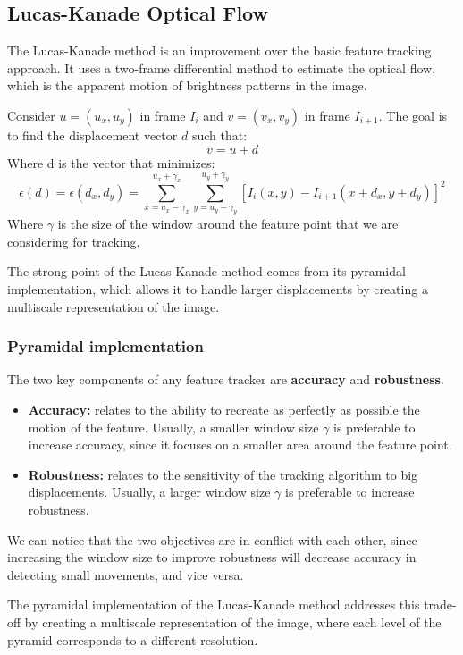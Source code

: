 \subsection{Lucas-Kanade Optical Flow}
The Lucas-Kanade method is an improvement over the basic feature tracking approach.
It uses a two-frame differential method to estimate the optical flow, which is the apparent motion of brightness patterns in the image.

Consider $u = (u_x, u_y)$ in frame $I_i$ and $v = (v_x, v_y)$ in frame $I_{i+1}$. The goal is to find the displacement vector $d$ such that:
\[ v = u + d \]
Where d is the vector that minimizes:
\[ \epsilon(d) = \epsilon(d_x, d_y) = \sum_{x = u_x - \gamma_x}^{u_x + \gamma_x} \sum_{y = u_y - \gamma_y}^{u_y + \gamma_y} [I_i(x, y) - I_{i+1}(x + d_x, y + d_y)]^2 \]
Where $\gamma$ is the size of the window around the feature point that we are considering for tracking.

The strong point of the Lucas-Kanade method comes from its pyramidal implementation, which allows it to handle larger displacements by creating a multiscale representation of the image.

\subsubsection{Pyramidal implementation}
The two key components of any feature tracker are \textbf{accuracy} and \textbf{robustness}.
\begin{itemize}
    \item \textbf{Accuracy:} relates to the ability to recreate as perfectly as possible the motion of the feature. 
    Usually, a smaller window size $\gamma$ is preferable to increase accuracy, since it focuses on a smaller area around the feature point.
    \item \textbf{Robustness:} relates to the sensitivity of the tracking algorithm to big displacements. 
    Usually, a larger window size $\gamma$ is preferable to increase robustness.
\end{itemize}
We can notice that the two objectives are in conflict with each other, 
since increasing the window size to improve robustness will decrease accuracy in detecting small movements, and vice versa.

The pyramidal implementation of the Lucas-Kanade method addresses this trade-off by creating a multiscale representation of the image, 
where each level of the pyramid corresponds to a different resolution.

